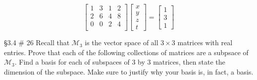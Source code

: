 \documentclass[]{exam}
\begin{document}
\begin{questions}
	\[\begin{bmatrix}
	1 & 3 & 1 & 2\\
	2 & 6 & 4 & 8\\
	0 & 0 & 2 & 4\\
	\end{bmatrix}
	\begin{bmatrix}
	x \\ y \\ z \\ t
	\end{bmatrix} = 
	\begin{bmatrix}
	1 \\ 3 \\ 1
	\end{bmatrix}\]
	\begin{solution}
	    
	\end{solution}
	
	\question \S 3.4 \# 26 Recall that $\mathcal{M}_3$ is the vector space of all $3 \times 3$ matrices with real entries. Prove that each of the following collections of matrices are a subpsace of $\mathcal{M}_3$. Find a basis for each of subspaces of 3 by 3 matrices, then state the dimension of the subspace. Make sure to justify why your basis is, in fact, a basis.
	
	

\end{questions}
\end{document}
